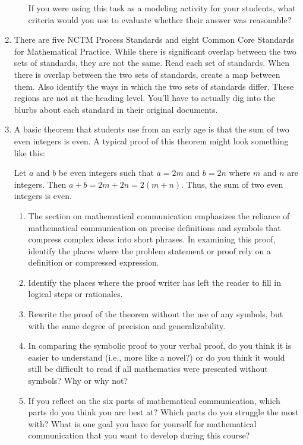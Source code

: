 \documentclass[
]{book}
\theoremstyle{definition}
\theoremstyle{definition}
\theoremstyle{definition}
\theoremstyle{definition}
\theoremstyle{remark}
\begin{document}
\begin{enumerate}
\begin{enumerate}
    If you were using this task as a modeling activity for your students, what criteria would you use to evaluate whether their answer was reasonable?
  \end{enumerate}
\item
  There are five NCTM Process Standards and eight Common Core Standards for Mathematical Practice. While there is significant overlap between the two sets of standards, they are not the same. Read each set of standards. When there is overlap between the two sets of standards, create a map between them. Also identify the ways in which the two sets of standards differ. These regions are not at the heading level. You'll have to actually dig into the blurbs about each standard in their original documents.
\item
  A basic theorem that students use from an early age is that the sum of two even integers is even. A typical proof of this theorem might look something like this:

  Let \(a\) and \(b\) be even integers such that \(a=2m\) and \(b=2n\) where \(m\) and \(n\) are integers. Then \(a+b=2m+2n=2(m+n)\). Thus, the sum of two even integers is even.

  \begin{enumerate}
  \def\labelenumii{\alph{enumii})}
  \item
    The section on mathematical communication emphasizes the reliance of mathematical communication on precise definitions and symbols that compress complex ideas into short phrases. In examining this proof, identify the places where the problem statement or proof rely on a definition or compressed expression.
  \item
    Identify the places where the proof writer has left the reader to fill in logical steps or rationales.
  \item
    Rewrite the proof of the theorem without the use of any symbols, but with the same degree of precision and generalizability.
  \item
    In comparing the symbolic proof to your verbal proof, do you think it is easier to understand (i.e., more like a novel?) or do you think it would still be difficult to read if all mathematics were presented without symbols? Why or why not?
  \item
    If you reflect on the six parts of mathematical communication, which parts do you think you are best at? Which parts do you struggle the most with? What is one goal you have for yourself for mathematical communication that you want to develop during this course?
  \end{enumerate}
\end{enumerate}
\end{document}
